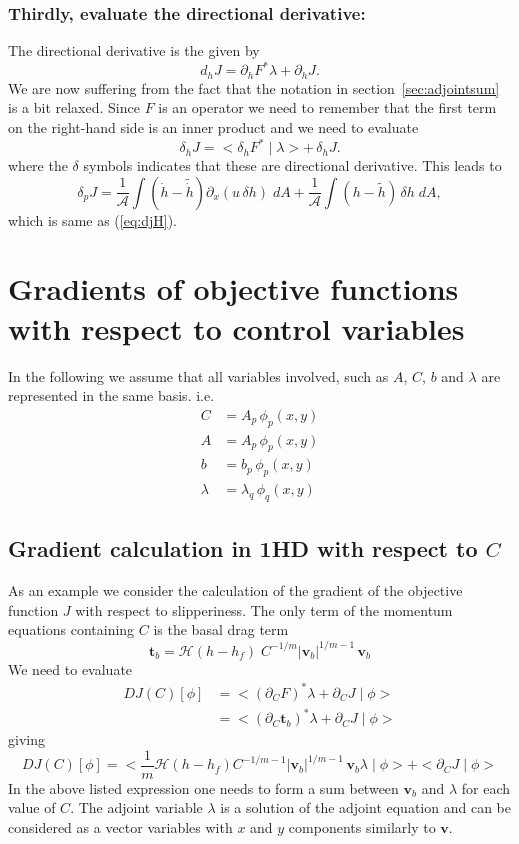 \documentclass[10pt,a4paper]{book}
\newcommand{\He}{\mathcal{H}}
\newcommand{\p}{\partial}
\begin{document}
\subsubsection{Thirdly, evaluate the directional derivative:}
The directional derivative is the given by
\[
d_{h} J = \p_{h} F^{*} \lambda + \p_{h} J .
\]
We are now suffering from the fact that the notation in
section~\ref{sec:adjointsum} is a bit relaxed. Since $F$ is an
operator we need to remember that the first term on the right-hand
side is an inner product and we need to evaluate
\[
\delta_{h} J = < \delta_{h} F^{*} \mid \lambda > + \, \delta_{h} J .
\]
where the $\delta$ symbols indicates that these are directional derivative. This leads to
\[
  \delta_p J = \frac{1}{\mathcal{A}} \int \left ( \dot{h}-\tilde{\dot{h}} \right ) \p_x (u \, \delta h)  \; dA     + \frac{1}{\mathcal{A}} \int \left ( h - \tilde{h} \right ) \, \delta h \; dA ,
\]
which is same as (\ref{eq:djH}).

\section{Gradients of objective functions with respect to control variables}



In the following we assume that all variables involved, such as $A$, $C$, $b$ and $\lambda$ are represented in the same basis. i.e.
\begin{align*}
          C & = A_p \, \phi_p(x,y) \\ 
          A & = A_p \, \phi_p(x,y) \\ 
          b & = b_p \, \phi_p(x,y) \\ 
    \lambda & =\lambda_q \, \phi_q(x,y)
\end{align*}


\subsection{Gradient calculation in 1HD with respect to $C$}

As an example we consider the calculation of the gradient of the
objective function $J$ with respect to slipperiness. The only term of
the momentum equations containing $C$ is the basal drag term
\[
\bm{t}_b   = \He(h-h_f) \; C^{-1/m} | \bm{v}_b|^{1/m-1} \, \bm{v}_b 
\]
We need to evaluate 
\begin{align*}
 D J(C)[\phi] &= < (\p_C F)^\ast \lambda  + \p_C J\mid  \phi >  \\
              &= < (\p_C \bm{t}_b)^\ast \lambda  + \p_C J\mid  \phi > 
\end{align*}
giving
\[
D J(C)[\phi]=< \frac{1}{m} \He(h-h_f) C^{-1/m-1} | \bm{v}_b|^{1/m-1} \, \bm{v}_b   \lambda \mid \phi > +  < \p_C J\mid  \phi > 
\]
In the above listed expression one needs to form a sum between
$\bm{v}_b$ and $\lambda$ for each value of $C$. The adjoint variable
$\lambda$ is a solution of the adjoint equation and can be considered
as a vector variables with $x$ and $y$ components similarly to
$\bm{v}$.
\end{document}
